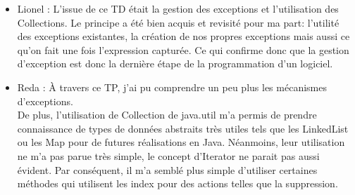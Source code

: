 \documentclass[a4paper,11pt]{article}
\begin{document}
\begin{itemize}
\item Lionel : L'issue de ce TD était la gestion des exceptions et l'utilisation des Collections. Le principe a été bien acquis et revisité pour ma part: l'utilité des exceptions existantes, la création de nos propres exceptions mais aussi ce qu'on fait une fois l'expression capturée. Ce qui confirme donc que la gestion d'exception est donc la dernière étape de la programmation d'un logiciel.\\

\item Reda : À travers ce TP, j'ai pu comprendre un peu plus les mécanismes d'exceptions. \\
De plus, l'utilisation de Collection de java.util m'a permis de prendre connaissance de types de données abstraits très utiles tels que les LinkedList ou les Map pour de futures réalisations en Java. Néanmoins, leur utilisation ne m'a pas parue très simple, le concept d'Iterator ne parait pas aussi évident. Par conséquent, il m'a semblé plus simple d'utiliser certaines méthodes qui utilisent les index pour des actions telles que la suppression.

\end{itemize}
\end{document}
